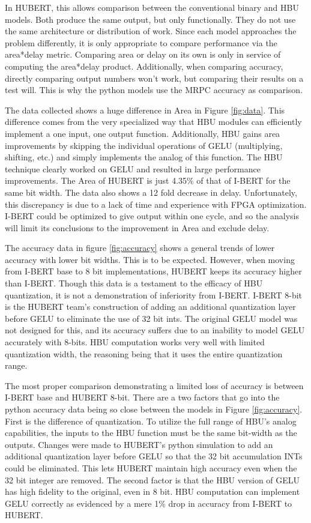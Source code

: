 \documentclass[12pt]{article}
\begin{document}
	In HUBERT, this allows comparison between the conventional binary and HBU models. Both produce the same output, but only functionally. They do not use the same architecture or distribution of work. Since each model approaches the problem differently, it is only appropriate to compare performance via the area*delay metric. Comparing area or delay on its own is only in service of computing the area*delay product. Additionally, when comparing accuracy, directly comparing output numbers won't work, but comparing their results on a test will. This is why the python models use the MRPC accuracy as comparison.
	
	The data collected shows a huge difference in Area in Figure \ref{fig:data}. This difference comes from the very specialized way that HBU modules can efficiently implement a one input, one output function. Additionally, HBU gains area improvements by skipping the individual operations of GELU (multiplying, shifting, etc.) and simply implements the analog of this function. The HBU technique clearly worked on GELU and resulted in large performance improvements. The Area of HUBERT is just 4.35\% of that of I-BERT for the same bit width. The data also shows a 12 fold decrease in delay. Unfortunately, this discrepancy is due to a lack of time and experience with FPGA optimization. I-BERT could be optimized to give output within one cycle, and so the analysis will limit its conclusions to the improvement in Area and exclude delay.
	
	The accuracy data in figure \ref{fig:accuracy} shows a general trends of lower accuracy with lower bit widths. This is to be expected. However, when moving from I-BERT base to 8 bit implementations, HUBERT keeps its accuracy higher than I-BERT. Though this data is a testament to the efficacy of HBU quantization, it is not a demonstration of inferiority from I-BERT. I-BERT 8-bit is the HUBERT team's construction of adding an additional quantization layer before GELU to eliminate the use of 32 bit ints. The original GELU model was not designed for this, and its accuracy suffers due to an inability to model GELU accurately with 8-bits. HBU computation works very well with limited quantization width, the reasoning being that it uses the entire quantization range. 
	
	The most proper comparison demonstrating a limited loss of accuracy is between I-BERT base and HUBERT 8-bit. There are a two factors that go into the python accuracy data being so close between the models in Figure \ref{fig:accuracy}. First is the difference of quantization. To utilize the full range of HBU's analog capabilities, the inputs to the HBU function must be the same bit-width as the outputs. Changes were made to HUBERT's python simulation to add an additional quantization layer before GELU so that the 32 bit accumulation INTs could be eliminated. This lets HUBERT maintain high accuracy even when the 32 bit integer are removed. The second factor is that the HBU version of GELU has high fidelity to the original, even in 8 bit. HBU computation can implement GELU correctly as evidenced by a mere 1\% drop in accuracy from I-BERT to HUBERT.
	
\end{document}
